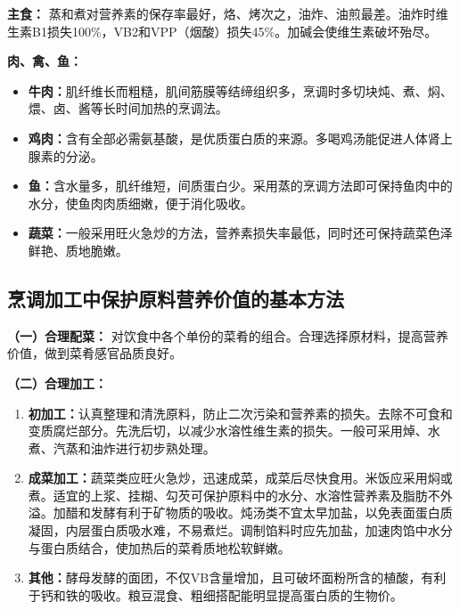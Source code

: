 \begin{tipbox}
\textbf{主食：}%
蒸和煮对营养素的保存率最好，烙、烤次之，油炸、油煎最差。油炸时维生素B1损失100\%，VB2和VPP（烟酸）损失45\%。加碱会使维生素破坏殆尽。

\textbf{肉、禽、鱼：}
\begin{itemize}[leftmargin=*]
    \item \textbf{牛肉：}肌纤维长而粗糙，肌间筋膜等结缔组织多，烹调时多切块炖、煮、焖、煨、卤、酱等长时间加热的烹调法。
    \item \textbf{鸡肉：}含有全部必需氨基酸，是优质蛋白质的来源。多喝鸡汤能促进人体肾上腺素的分泌。
    \item \textbf{鱼：}含水量多，肌纤维短，间质蛋白少。采用蒸的烹调方法即可保持鱼肉中的水分，使鱼肉肉质细嫩，便于消化吸收。
    \item \textbf{蔬菜：}一般采用旺火急炒的方法，营养素损失率最低，同时还可保持蔬菜色泽鲜艳、质地脆嫩。
\end{itemize}
\end{tipbox}

\subsection{烹调加工中保护原料营养价值的基本方法}

\begin{tipbox}
\textbf{（一）合理配菜：}%
对饮食中各个单份的菜肴的组合。合理选择原材料，提高营养价值，做到菜肴感官品质良好。

\textbf{（二）合理加工：}
\begin{enumerate}[leftmargin=*]
    \item \textbf{初加工：}认真整理和清洗原料，防止二次污染和营养素的损失。去除不可食和变质腐烂部分。先洗后切，以减少水溶性维生素的损失。一般可采用焯、水煮、汽蒸和油炸进行初步熟处理。
    \item \textbf{成菜加工：}蔬菜类应旺火急炒，迅速成菜，成菜后尽快食用。米饭应采用焖或煮。适宜的上浆、挂糊、勾芡可保护原料中的水分、水溶性营养素及脂肪不外溢。加醋和发酵有利于矿物质的吸收。炖汤类不宜太早加盐，以免表面蛋白质凝固，内层蛋白质吸水难，不易煮烂。调制馅料时应先加盐，加速肉馅中水分与蛋白质结合，使加热后的菜肴质地松软鲜嫩。
    \item \textbf{其他：}酵母发酵的面团，不仅VB含量增加，且可破坏面粉所含的植酸，有利于钙和铁的吸收。粮豆混食、粗细搭配能明显提高蛋白质的生物价。
\end{enumerate}
\end{tipbox}

